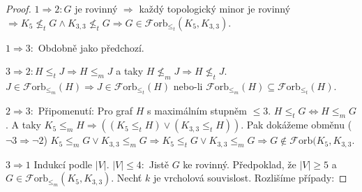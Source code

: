 \begin{proof}
	$1 \Rightarrow 2: G$ je rovinný $\Rightarrow$ každý topologický minor je rovinný $\Rightarrow K_{5} \not\leq_{t} G \land K_{3,3} \not\leq_{t} G \Rightarrow G \in \mathcal{F}\text{orb}_{\leq_{t}}(K_{5},K_{3,3})$.
	
	$1 \Rightarrow 3:$ Obdobně jako předchozí.
	
	$3 \Rightarrow 2: H \leq_{t} J \Rightarrow H \leq_{m} J$ a taky $H \nleq_{m} J \Rightarrow H \nleq_{t} J$. $J \in \mathcal{F}\text{orb}_{\leq_{m}}(H) \Rightarrow J \in \mathcal{F}\text{orb}_{\leq_{t}}(H)$ nebo-li $\mathcal{F}\text{orb}_{\leq_{m}}(H) \subseteq \mathcal{F}\text{orb}_{\leq_{t}}(H)$.
	
	$2 \Rightarrow 3:$  Připomenutí: Pro graf $H$ s maximálním stupněm $\leq 3$. $H \leq_{t} G \Leftrightarrow H \leq_{m} G$. A taky $K_{5} \leq_{m} H \Rightarrow ((K_{5} \leq_{t} H) \lor (K_{3,3} \leq_{t} H))$. Pak dokážeme obměnu ($\neg 3 \Rightarrow \neg 2$) $K_{5} \leq_{m} G \lor K_{3,3} \leq_{m} G \Rightarrow K_{5} \leq_{t} G \lor K_{3,3} \leq_{m} G \Rightarrow G \notin \mathcal{F}\text{orb}(K_{5},K_{3,3}$.
	
	$3 \Rightarrow 1$ Indukcí podle $|V|$. $|V| \leq 4:$ Jistě $G$ ke rovinný. Předpoklad, že $|V| \geq 5$ a $G \in \mathcal{F}\text{orb}_{\leq_{m}}(K_{5},K_{3,3})$. Nechť $k$ je vrcholová souvislost. Rozlišíme případy:
	

\end{proof}
